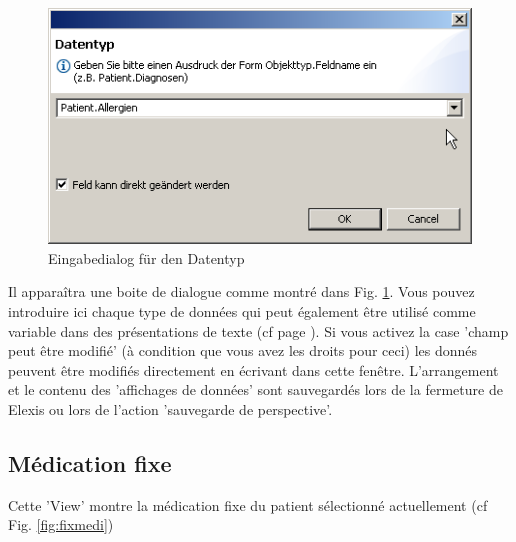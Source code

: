 \begin{figure}[hb]
\includegraphics{images/data2}
\caption{Eingabedialog für den Datentyp}
\label{figure2}
\end{figure}
Il apparaîtra une boite de dialogue comme montré dans Fig. \ref{figure2}.
Vous pouvez introduire ici chaque type de données qui peut également être utilisé comme variable dans des présentations de texte (cf page \pageref{Platzhalter}).
Si vous activez la case 'champ peut être modifié' (à condition que vous avez les droits pour ceci) les donnés peuvent être modifiés directement en écrivant dans cette fenêtre. L'arrangement et le contenu des 'affichages de données' sont sauvegardés lors de la fermeture de Elexis ou lors de l'action 'sauvegarde de perspective'.



\subsection{Médication fixe}
Cette 'View' montre la médication fixe du patient sélectionné actuellement (cf Fig. \ref{fig:fixmedi})

